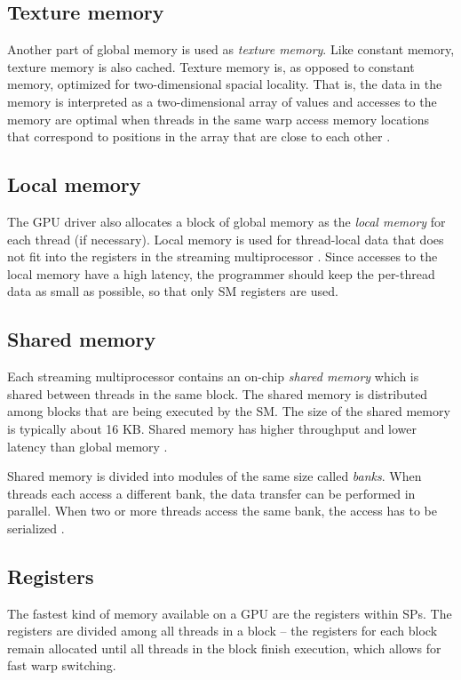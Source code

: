 \documentclass[12pt,oneside]{fithesis2}
\begin{document}
      \subsection{Texture memory}
      Another part of global memory is used as \emph{texture memory}. Like constant memory, texture memory is also cached. Texture memory is, as opposed to constant memory, optimized for two-dimensional spacial locality. That is, the data in the memory is interpreted as a two-dimensional array of values and accesses to the memory are optimal when threads in the same warp access memory locations that correspond to positions in the array that are close to each other \cite[section 5.3.2., Texture memory]{nvidia:cudaProgGuide}.
      
      \subsection{Local memory}
      The GPU driver also allocates a block of global memory as the \emph{local memory} for each thread (if necessary). Local memory is used for thread-local data that does not fit into the registers in the streaming multiprocessor \cite[section 5.3.2., Local memory]{nvidia:cudaProgGuide}. Since accesses to the local memory have a high latency, the programmer should keep the per-thread data as small as possible, so that only SM registers are used.
      
      \subsection{Shared memory}
      Each streaming multiprocessor contains an on-chip \emph{shared memory} which is shared between threads in the same block. The shared memory is distributed among blocks that are being executed by the SM. The size of the shared memory is typically about 16 KB. Shared memory has higher throughput and lower latency than global memory \cite[section 5.3.2., Shared memory]{nvidia:cudaProgGuide}.
      
      Shared memory is divided into modules of the same size called \emph{banks}. When threads each access a different bank, the data transfer can be performed in parallel. When two or more threads access the same bank, the access has to be serialized \cite[section 5.3.2., Shared memory]{nvidia:cudaProgGuide}.
      
      \subsection{Registers}
      The fastest kind of memory available on a GPU are the registers within SPs. The registers are divided among all threads in a block -- the registers for each block remain allocated until all threads in the block finish execution, which allows for fast warp switching.
      
\end{document}
